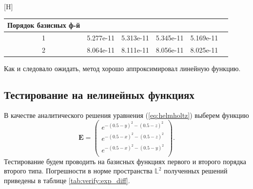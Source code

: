 \documentclass[a4paper,14pt]{article}
\makeatletter
\renewenvironment{table}[1][\fps@table]{
  \edef\@tempa{\noexpand\@float{table}[#1]}
  \@tempa
  \addtocounter{footable}{1}
}{
  \end@float
}
\makeatother
\begin{document}
\begin{table}[H]
	\caption{относительные погрешности в норме $\mathbb{L}^2$}
	\label{tab:verify:linear_diff}
	\begin{tabularx}{\textwidth}{|C{1}|C{1}|C{1}|C{1}|C{1}|C{1}|}
		\hline Порядок базисных ф-й &  &  &  &  \\
		 & 5.277e-11 & 5.313e-11 & 5.345e-11 & 5.169e-11 \\
		 & 8.064e-11 & 8.111e-11 & 8.056e-11 & 8.025e-11 \\
		\hline
	\end{tabularx}
\end{table}
\vspace{-0.5cm}Как и следовало ожидать, метод хорошо аппроксимировал линейную функцию.


\subsection{Тестирование на нелинейных функциях}

В качестве аналитического решения уравнения (\ref{eq:helmholtz}) выберем функцию
\begin{equation}
	\mathbf{E} = \left( \begin{array}{c}
		e^{-(0.5-y)^2 -(0.5-z)^2} \\
		e^{-(0.5-x)^2 -(0.5-z)^2} \\
		e^{-(0.5-x)^2 -(0.5-y)^2} \\
	\end{array} \right) .
	\label{eq:verify:exp_solution}
\end{equation}
Тестирование будем проводить на базисных функциях первого и второго порядка второго типа. Погрешности в норме пространства $\mathbb{L}^2$ полученных решений приведены в таблице \ref{tab:verify:exp_diff}.
\end{document}
